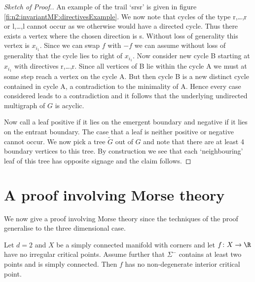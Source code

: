 \begin{proof}[Sketch of Proof.]
  An example of the trail `srsr' is given in figure \ref{fi:n2:invariantMF:directivesExample}.
  We now note that cycles of the type r,\dots,r or l,\dots,l
  cannot occur as we otherwise would have a directed cycle. Thus there exists a vertex where the chosen direction is s. 
  Without loss of generality this vertex is $x_{i_1}$.
  Since we can swap $f$ with $-f$ we can assume without loss of generality that the cycle lies to right of $x_{i_1}$.
  Now consider new cycle B starting at $x_{i_1}$ with directives r,\dots,r.
  Since all vertices of B lie within the cycle A we must at some step reach a vertex on the cycle A. But then cycle B is a new distinct cycle
  contained in cycle A, a contradiction to the minimality of A.
  Hence every case considered leads to a contradiction and it follows that the underlying undirected multigraph of $G$
  is acyclic.
  
  Now call a leaf positive if it lies on the emergent boundary and
  negative if it lies on the entrant boundary. The case that a leaf is neither positive or negative cannot occur.
  We now pick a tree $\widetilde{G}$ out of $G$ and note that
  there are at least 4 boundary vertices to this tree.
  By construction we see that each `neighbouring' leaf of this tree
  has opposite signage and the claim follows.
\end{proof}


\section{A proof involving Morse theory}

We now give a proof involving Morse theory since the techniques of the proof generalise to the three dimensional case.
\begin{proposition}
  Let $d=2$ and $X$ be a simply connected manifold with corners and let $f\colon X\to\R$ have no irregular critical points.
  Assume further that $\Sigma^-$ contains at least two points and is simply connected. Then $f$ has no non-degenerate interior critical point.
\end{proposition}

